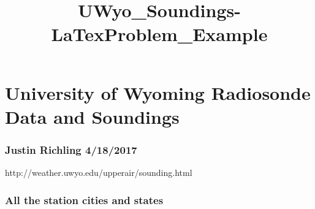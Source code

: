 \documentclass[11pt]{article}
\title{UWyo\_Soundings-LaTexProblem\_Example}
\begin{document}
    
    
    \maketitle
    
    

    
    \hypertarget{university-of-wyoming-radiosonde-data-and-soundings}{%
\section{University of Wyoming Radiosonde Data and
Soundings}\label{university-of-wyoming-radiosonde-data-and-soundings}}

    \hypertarget{justin-richling-4182017}{%
\subsubsection{Justin Richling
4/18/2017}\label{justin-richling-4182017}}

    http://weather.uwyo.edu/upperair/sounding.html

    \hypertarget{all-the-station-cities-and-states}{%
\subsubsection{All the station cities and
states}\label{all-the-station-cities-and-states}}
\end{document}
